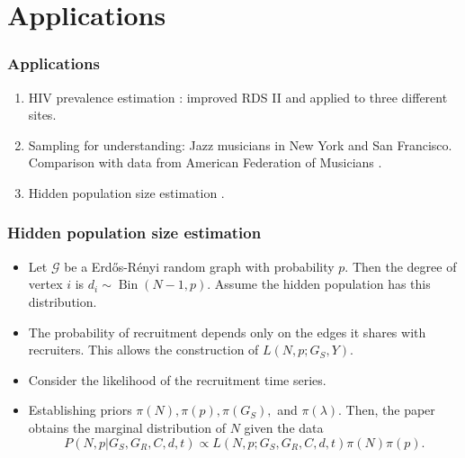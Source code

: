 \documentclass{beamer}
\newcommand{\Space}{\vspace{3ex}}
\begin{document}
\section{Applications}

\begin{frame}
  \frametitle{Applications}

  \begin{enumerate}
    \item HIV prevalence estimation \cite{gile2011improved}: improved
    RDS II and applied to three different sites.
    
    \Space

    \item Sampling for understanding: Jazz musicians in New York and San
    Francisco. Comparison with data from American Federation of Musicians
    \cite{salganik2004sampling}. 

    \Space
    
    \item Hidden population size estimation \cite{crawford2018hidden}. 
  \end{enumerate}
\end{frame}

\begin{frame}
  \frametitle{Hidden population size estimation}

  \begin{itemize}
    \justifying
    
    \item Let $\mathcal{G}$ be a Erdős-Rényi random graph with probability
    $p$. Then the degree of vertex $i$ is $d_i \sim \operatorname{Bin}(N-1,
    p)$. Assume the hidden population has this distribution. 
    
    \item The probability of recruitment depends only on the edges it shares
    with recruiters. This allows the construction of $L(N,p; G_S, Y)$. 
    
    \item Consider the likelihood of the recruitment time series. 
    
    \item Establishing priors $\pi(N), \pi(p), \pi(G_S), $ and $\pi(\lambda)$.
    Then, the paper obtains the marginal distribution of $N$ given the data
    $$P(N, p|G_S, G_R, C, d, t) \propto L(N, p; G_S, G_R, C, d, t)\pi(N)\pi (p).$$
    
  \end{itemize}

\end{frame}
\end{document}

